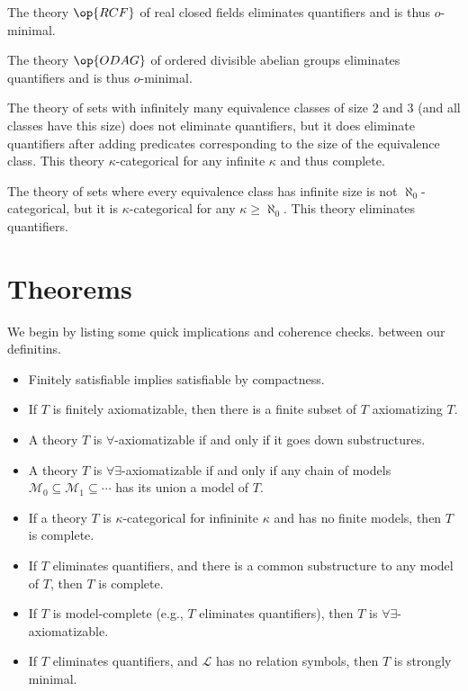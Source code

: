 \documentclass{article}
\begin{document}
\begin{example}
	The theory $\op{RCF}$ of real closed fields eliminates quantifiers and is thus $o$-minimal.
\end{example}
\begin{example}
	The theory $\op{ODAG}$ of ordered divisible abelian groups eliminates quantifiers and is thus $o$-minimal.
\end{example}
\begin{example}
	The theory of sets with infinitely many equivalence classes of size $2$ and $3$ (and all classes have this size) does not eliminate quantifiers, but it does eliminate quantifiers after adding predicates corresponding to the size of the equivalence class. This theory $\kappa$-categorical for any infinite $\kappa$ and thus complete.
\end{example}
\begin{example}
	The theory of sets where every equivalence class has infinite size is not $\aleph_0$-categorical, but it is $\kappa$-categorical for any $\kappa\ge\aleph_0$. This theory eliminates quantifiers.
\end{example}

\newpage
\section{Theorems}

We begin by listing some quick implications and coherence checks. between our definitins.
\begin{itemize}
	\item Finitely satisfiable implies satisfiable by compactness.
	\item If $T$ is finitely axiomatizable, then there is a finite subset of $T$ axiomatizing $T$.
	\item A theory $T$ is $\forall$-axiomatizable if and only if it goes down substructures.
	\item A theory $T$ is $\forall\exists$-axiomatizable if and only if any chain of models $\mathcal M_0\subseteq\mathcal M_1\subseteq\cdots$ has its union a model of $T$.
	\item If a theory $T$ is $\kappa$-categorical for infininite $\kappa$ and has no finite models, then $T$ is complete.
	\item If $T$ eliminates quantifiers, and there is a common substructure to any model of $T$, then $T$ is complete.
	\item If $T$ is model-complete (e.g., $T$ eliminates quantifiers), then $T$ is $\forall\exists$-axiomatizable.
	\item If $T$ eliminates quantifiers, and $\mathcal L$ has no relation symbols, then $T$ is strongly minimal.
\end{itemize}
\end{document}
